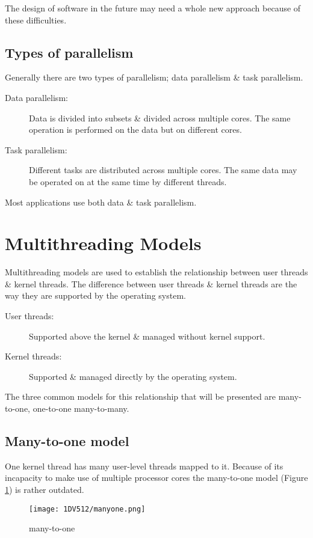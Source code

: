 \documentclass[a4paper,11pt]{article}
\begin{document}
The design of software in the future may need a whole new approach because of these difficulties. 
\subsection{Types of parallelism}
Generally there are two types of parallelism; data parallelism \& task parallelism.

\begin{description}
    \item [Data parallelism:] Data is divided into subsets \& divided across multiple cores. The same operation is performed on the data but on different cores.
    \item [Task parallelism:] Different tasks are distributed across multiple cores. The same data may be operated on at the same time by different threads. 
\end{description}

Most applications use both data \& task parallelism.

\newpage\section{Multithreading Models}
Multithreading models are used to establish the relationship between user threads \& kernel threads. The difference between user threads \& kernel threads are the way they are supported by the operating system.

\begin{description}
    \item[User threads:] Supported above the kernel \& managed without kernel support.
    \item[Kernel threads:] Supported \& managed directly by the operating system.
\end{description}

The three common models for this relationship that will be presented are many-to-one, one-to-one  many-to-many.

\subsection{Many-to-one model}
One kernel thread has many user-level threads mapped to it. Because of its incapacity to make use of multiple processor cores the many-to-one model (Figure \ref{manytoone}) is rather outdated. 
\begin{figure}[ht]
\centering
[1]
\texttt{[image: 1DV512/manyone.png]}
\caption{many-to-one}
\label{manytoone}
\end{figure}
\end{document}

